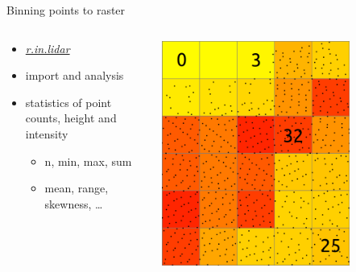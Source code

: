 \documentclass[xcolor={dvipsnames,usenames},beamer,aspectratio=169]{beamer}
\newcommand{\gmodule}[1]{\href{http://grass.osgeo.org/grass71/manuals/#1.html}{\emph{#1}}}
\begin{document}
\begin{frame}{Binning points to raster}

\begin{columns}
\begin{column}{0.4\textwidth}

 \begin{itemize}
  \item \gmodule{r.in.lidar}
  \item import and analysis
  \item statistics of point counts, height and intensity
  \begin{itemize}
    \item n, min, max, sum
    \item mean, range, skewness, \ldots
  \end{itemize}
\end{itemize}

\end{column}
\begin{column}{0.45\textwidth}

\begin{center}
  \includegraphics[width=0.75\textwidth]{features/binning_count}
\end{center}

\end{column}
\end{columns}

\end{frame}
\end{document}
